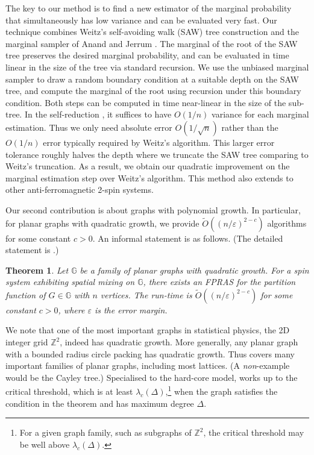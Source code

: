 \documentclass[10pt,a4paper]{article}
\newtheorem{theorem}{Theorem}[section]
\def\=#1{\mathbb{#1}}
\newcommand{\eps}{\varepsilon}
\begin{document}
The key to our method is to find a new estimator of the marginal probability that simultaneously has low variance and can be evaluated very fast.
Our technique combines Weitz's self-avoiding walk (SAW) tree construction and the marginal sampler of Anand and Jerrum \cite{AJ22}.
The marginal of the root of the SAW tree preserves the desired marginal probability,
and can be evaluated in time linear in the size of the tree via standard recursion.
We use the unbiased marginal sampler to draw a random boundary condition at a suitable depth on the SAW tree, and compute the marginal of the root using recursion under this boundary condition.
Both steps can be computed in time near-linear in the size of the sub-tree.
In the self-reduction \cite{JVV86}, it suffices to have $O(1/n)$ variance for each marginal estimation.
Thus we only need absolute error $O(1/\sqrt{n})$ rather than the $O(1/n)$ error typically required by Weitz's algorithm.
This larger error tolerance roughly halves the depth where we truncate the SAW tree comparing to Weitz's truncation. %
As a result, we obtain our quadratic improvement on the marginal estimation step over Weitz's algorithm.
This method also extends to other anti-ferromagnetic 2-spin systems.

Our second contribution is about graphs with polynomial growth.
In particular, for planar graphs with quadratic growth,
we provide $\widetilde{O}((n/\eps)^{2-c})$ algorithms for some constant $c>0$.
An informal statement is as follows.
(The detailed statement is .)

\begin{theorem}\label{thm:main2}
  Let $\=G$ be a family of planar graphs with quadratic growth.
  For a spin system exhibiting spatial mixing on $\=G$,
  there exists an FPRAS for the partition function of $G\in\=G$ with $n$ vertices.
  The run-time is $\widetilde{O}((n/\eps)^{2-c})$ for some constant $c>0$,
  where $\eps$ is the error margin.
\end{theorem}

We note that one of the most important graphs in statistical physics, the 2D integer grid $\=Z^2$, indeed has quadratic growth.
More generally, any planar graph with a bounded radius circle packing has quadratic growth.
Thus  covers many important families of planar graphs, including most lattices.
(A \emph{non}-example would be the Cayley tree.)
Specialised to the hard-core model, 
 works up to the critical threshold, which is at least $\lambda_c(\Delta)$,\footnote{For a given graph family, such as subgraphs of $\mathbb{Z}^2$, the critical threshold may be well above $\lambda_c(\Delta)$.}
when the graph satisfies the condition in the theorem and has maximum degree $\Delta$.
\end{document}

